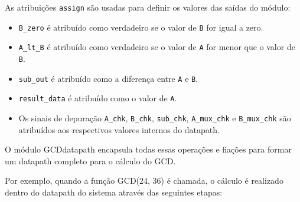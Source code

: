 \documentclass[a4paper,11pt]{article} %
\begin{document}
As atribuições \texttt{assign} são usadas para definir os valores das saídas do módulo:

\begin{itemize}
    \item \texttt{B\_zero} é atribuído como verdadeiro se o valor de \texttt{B} for igual a zero.
    \item \texttt{A\_lt\_B} é atribuído como verdadeiro se o valor de \texttt{A} for menor que o valor de \texttt{B}.
    \item \texttt{sub\_out} é atribuído como a diferença entre \texttt{A} e \texttt{B}.
    \item \texttt{result\_data} é atribuído como o valor de \texttt{A}.
    \item Os sinais de depuração \texttt{A\_chk}, \texttt{B\_chk}, \texttt{sub\_chk}, \texttt{A\_mux\_chk} e \texttt{B\_mux\_chk} são atribuídos aos respectivos valores internos do datapath.
\end{itemize}


O módulo GCDdatapath encapsula todas essas operações e fiações para formar um datapath completo para o cálculo do GCD.

Por exemplo, quando a função GCD(24, 36) é chamada, o cálculo é realizado dentro do datapath do sistema através das seguintes etapas:
\end{document}
